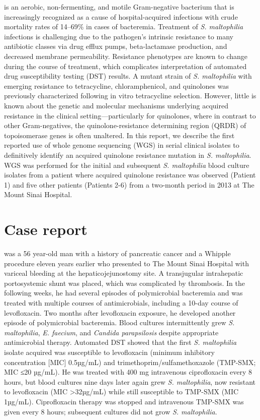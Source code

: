  is an aerobic, non-fermenting, and motile Gram-negative bacterium that is increasingly recognized as a cause of hospital-acquired infections with crude mortality rates of 14–69\% in cases of bacteremia.\autocite{Brooke2012} Treatment of \emph{S. maltophilia} infections is challenging due to the pathogen’s intrinsic resistance to many antibiotic classes via drug efflux pumps, beta-lactamase production, and decreased membrane permeability.\autocite{Brooke2012} Resistance phenotypes are known to change during the course of treatment, which complicates interpretation of automated drug susceptibility testing (DST) results. A mutant strain of \emph{S. maltophilia} with emerging resistance to tetracycline, chloramphenicol, and quinolones was previously characterized following in vitro tetracycline selection. However, little is known about the genetic and molecular mechanisms underlying acquired resistance in the clinical setting—par\-ti\-cu\-lar\-ly for quinolones, where in contrast to other Gram-negatives, the qui\-no\-lone-\allowbreak re\-sis\-tance determining region (QRDR) of topoisomerase genes is often unaltered.\autocite{Valdezate2005} In this report, we describe the first reported use of whole genome sequencing (WGS) in serial clinical isolates to definitively identify an acquired quinolone resistance mutation in \emph{S. maltophilia}. WGS was performed for the initial and subsequent \emph{S. maltophilia} blood culture isolates from a patient where acquired quinolone resistance was observed (Patient 1) and five other patients (Patients 2-6) from a two-month period in 2013 at The Mount Sinai Hospital. 

\section{Case report}

 was a 56 year-old man with a history of pancreatic cancer and a Whipple procedure eleven years earlier who presented to The Mount Sinai Hospital with variceal bleeding at the hepaticojejunostomy site. A transjugular intrahepatic portosystemic shunt was placed, which was complicated by thrombosis. In the following weeks, he had several episodes of polymicrobial bacteremia and was treated with multiple courses of antimicrobials, including a 10-day course of levofloxacin. Two months after levofloxacin exposure, he developed another episode of polymicrobial bacteremia. Blood cultures intermittently grew \emph{S. maltophilia}, \emph{E. faecium}, and \emph{Candida parapsilosis} despite appropriate antimicrobial therapy. Automated DST showed that the first \emph{S. maltophilia} isolate acquired was susceptible to levofloxacin (minimum inhibitory concentration [MIC] 0.5µg/mL) and trimethoprim/sulfamethoxazole (TMP-SMX; MIC ≤20 µg/mL). He was treated with 400 mg intravenous ciprofloxacin every 8 hours, but blood cultures nine days later again grew \emph{S. maltophilia}, now resistant to levofloxacin (MIC >32µg/mL) while still susceptible to TMP-SMX (MIC 1µg/mL). Ciprofloxacin therapy was stopped and intravenous TMP-SMX was given every 8 hours; subsequent cultures did not grow \emph{S. maltophilia}.

